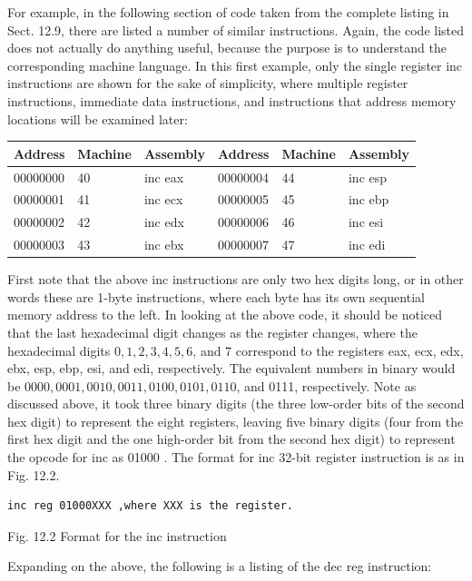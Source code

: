 \documentclass[10pt]{book}
\begin{document}
For example, in the following section of code taken from the complete listing in Sect. 12.9, there are listed a number of similar instructions. Again, the code listed does not actually do anything useful, because the purpose is to understand the corresponding machine language. In this first example, only the single register inc instructions are shown for the sake of simplicity, where multiple register instructions, immediate data instructions, and instructions that address memory locations will be examined later:

\begin{center}
\begin{tabular}{|l|l|l|l|l|l|}
\hline
Address & Machine & Assembly & Address & Machine & Assembly \\
\hline
00000000 & 40 & inc eax & 00000004 & 44 & inc esp \\
\hline
00000001 & 41 & inc ecx & 00000005 & 45 & inc ebp \\
\hline
00000002 & 42 & inc edx & 00000006 & 46 & inc esi \\
\hline
00000003 & 43 & inc ebx & 00000007 & 47 & inc edi \\
\hline
\end{tabular}
\end{center}

First note that the above inc instructions are only two hex digits long, or in other words these are 1-byte instructions, where each byte has its own sequential memory address to the left. In looking at the above code, it should be noticed that the last hexadecimal digit changes as the register changes, where the hexadecimal digits $0,1,2,3,4,5,6$, and 7 correspond to the registers eax, ecx, edx, ebx, esp, ebp, esi, and edi, respectively. The equivalent numbers in binary would be $0000,0001,0010,0011,0100,0101,0110$, and 0111, respectively. Note as discussed above, it took three binary digits (the three low-order bits of the second hex digit) to represent the eight registers, leaving five binary digits (four from the first hex digit and the one high-order bit from the second hex digit) to represent the opcode for inc as 01000 . The format for inc 32-bit register instruction is as in Fig. 12.2.

\begin{verbatim}
inc reg 01000XXX ,where XXX is the register.
\end{verbatim}

Fig. 12.2 Format for the inc instruction

Expanding on the above, the following is a listing of the dec reg instruction:
\end{document}
